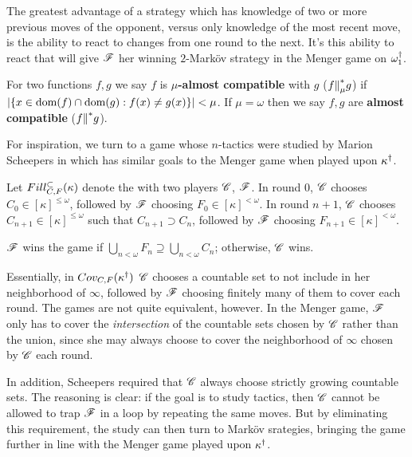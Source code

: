 The greatest advantage of a strategy which has knowledge of two or more previous
moves of the opponent, versus only knowledge of the most recent move, is the
ability to react to changes from one round to the next. It's this ability to
react that will give $\mathscr{F}$ her winning $2$-Mark\"ov strategy in the Menger
game on $\omega^\dagger_1$.

\begin{defn}
  For two functions $f,g$ we say $f$ is \textbf{$\mu$-almost compatible} with
  $g$ ($f{\parallel}^*_\mu g$) if $|\{x\in\textrm{dom}(f)\cap\textrm{dom}(g):f(x)\not=g(x)\}|<\mu$.
  If $\mu=\omega$ then we say $f,g$ are \textbf{almost compatible}
  ($f{\parallel}^* g$).
\end{defn}

For inspiration, we turn to a game whose $n$-tactics were studied by Marion
Scheepers in \cite{MR1129143} which has similar goals to the Menger game when
played upon $\kappa^\dagger$.

\begin{game}
  Let $Fill^{\subset}_{C,F}(\kappa)$ denote the 
  with two players $\mathscr{C}$, $\mathscr{F}$. In round $0$, $\mathscr{C}$ chooses
  $C_0\in[\kappa]^{\leq\omega}$, followed by $\mathscr{F}$ choosing
  $F_0\in[\kappa]^{<\omega}$. In round $n+1$, $\mathscr{C}$ chooses
  $C_{n+1}\in[\kappa]^{\leq\omega}$ such that $C_{n+1}\supset C_n$, followed
  by $\mathscr{F}$ choosing $F_{n+1}\in[\kappa]^{<\omega}$.

  $\mathscr{F}$ wins the game if
  $\bigcup_{n<\omega} F_n\supseteq\bigcup_{n<\omega} C_n$; otherwise, $\mathscr{C}$
  wins.
\end{game}

Essentially, in $Cov_{C,F}(\kappa^\dagger)$ $\mathscr{C}$ chooses a countable set
to not include in her neighborhood of $\infty$, followed by $\mathscr{F}$ choosing
finitely many of them to cover each round. The games are not quite equivalent,
however. In the Menger game, $\mathscr{F}$ only has to cover the \textit{intersection}
of the countable sets chosen by $\mathscr{C}$ rather than the union, since she may
always choose to cover the neighborhood of $\infty$ chosen by $\mathscr{C}$ each
round.

In addition, Scheepers required that $\mathscr{C}$ always choose strictly growing
countable sets. The reasoning is clear: if the goal is to study tactics, then
$\mathscr{C}$ cannot be allowed to trap $\mathscr{F}$ in a loop by repeating the same moves.
But by eliminating this requirement, the study can then turn to Mark\"ov
srategies, bringing the game further in line with the Menger game played upon
$\kappa^\dagger$.

